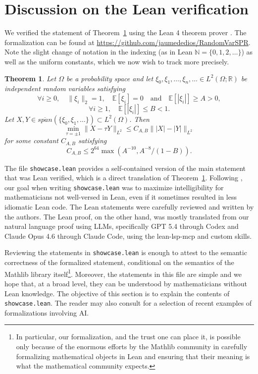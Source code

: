 \documentclass[11pt]{amsart}
\numberwithin{equation}{section}
\newtheorem{theorem}{Theorem}[section]
\theoremstyle{definition}
\theoremstyle{remark}
\newcommand{\E}{\mathbb E}
\begin{document}
\section{Discussion on the Lean verification}
We verified the statement of Theorem~\ref{thm:lean} using the Lean 4 theorem prover \cite{moura2021lean}. The formalization can be found  at {\small \url{https://github.com/jaumededios/RandomVarSPR}}. Note the slight change of notation in the indexing
  (as in Lean $\mathbb{N}=\{0,1,2,\ldots\}$) as well as the uniform constants, which we now wish to track more precisely.
\begin{theorem} \label{thm:lean}
    Let $\Omega$ be a probability space and let $\xi_0,\xi_1,\ldots, \xi_{n}, \ldots \in L^2(\Omega;\mathbb{R})$ be independent random variables satisfying
    \[
    \forall i \ge 0,\quad \|\xi_i\|_2 = 1, \quad \mathbb E[\xi_i] = 0 \quad  \text{and} \quad \E[|\xi_i|] \ge A>0,
    \]
    \[
    \forall i  \ge 1, \quad \E[|\xi_i|] \le B<1 .
    \]
    Let $X, Y \in \overline{span}(\{\xi_0,\xi_1, \dots \})\subset L^2(\Omega)$.
    Then 
    \[
    \min_{\tau = \pm 1} \|X-\tau Y\|_{L^2} \le C_{A,B}\||X|-|Y|\|_{L^2}
    \]
     for some constant $C_{A,B}$ satisfying
    \[
    C_{A,B}
    \le
    2^{64}
    \max \left(A^{-10},A^{-8}/(1-B)\right).
    \]
\end{theorem}
The file {\scriptsize \texttt{showcase.lean}} provides a self-contained version of the main statement that was Lean verified, which is a direct translation of Theorem~\ref{thm:lean}. Following \cite{bertolini20262}, our goal when writing {\scriptsize \texttt{showcase.lean}} was to maximize intelligibility for mathematicians not well-versed in Lean, even
if it sometimes resulted in less idiomatic Lean code. The Lean statements were carefully reviewed and written by the authors. The Lean proof, on the other hand, was mostly translated from our natural language proof using LLMs, specifically GPT 5.4 through Codex and Claude Opus 4.6 through Claude Code, using the lean-lsp-mcp \cite{lean-lsp-mcp} and custom skills.

Reviewing the statements in {\scriptsize \texttt{showcase.lean}} is enough to attest to the semantic correctness of the formalized statement, conditional on the semantics of the Mathlib library itself\footnote{In particular, our formalization, and the trust one can place it, is possible only because of the enormous
efforts by the Mathlib community \cite{mathlib2020} in carefully formalizing mathematical objects in Lean and
ensuring that their meaning is what the mathematical community expects.}. Moreover, the statements in this file are simple and we hope that, at a broad level, they can be understood by mathematicians without Lean knowledge. The objective of this section is to explain the contents of {\scriptsize \texttt{showcase.lean}}. The reader may also consult \cite{armstrong2026formalization,chen2026thakur,hariharan2026milestone,ho2026erd,ilin2026semi} for a selection of recent examples of formalizations involving AI. 
\end{document}
